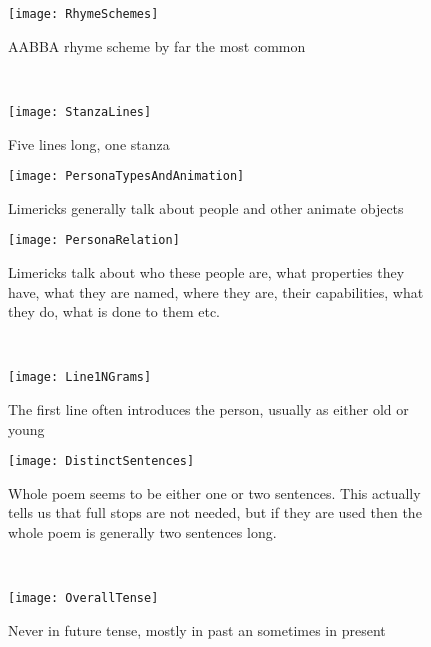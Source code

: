 \begin{figure}[t!]
\centering
\begin{minipage}[t]{.45\textwidth}
	\centering
	\texttt{[image: RhymeSchemes]}
	\caption{AABBA rhyme scheme by far the most common}
	\label{fig:rhyme-scheme-chart}
\end{minipage}
~
\begin{minipage}[t]{.45\textwidth}
	\centering
	\texttt{[image: StanzaLines]}
	\caption{Five lines long, one stanza}
	\label{fig:stanza-lines-chart}
\end{minipage}
\end{figure}

\begin{figure}[h!]
\centering
\texttt{[image: PersonaTypesAndAnimation]}
\caption{Limericks generally talk about people and other animate objects}
\label{fig:persona-chart}
\end{figure}


\begin{figure}[t!]
\centering
\begin{minipage}[t]{.45\textwidth}
	\centering
	\texttt{[image: PersonaRelation]}
	\caption{Limericks talk about who these people are, what properties they have, what they are named, where they are, their capabilities, what they do, what is done to them etc.}
	\label{fig:persona-relation-chart}
\end{minipage}
~
\begin{minipage}[t]{.45\textwidth}
	\centering
	\texttt{[image: Line1NGrams]}
	\caption{The first line often introduces the person, usually as either old or young}
	\label{fig:n-grams-1-chart}
\end{minipage}
\end{figure}


\begin{figure}[t!]
\centering
\begin{minipage}[t]{.45\textwidth}
	\centering
	\texttt{[image: DistinctSentences]}
	\caption{Whole poem seems to be either one or two sentences. This actually tells us that full stops are not needed, but if they are used then the whole poem is generally two sentences long.}
	\label{fig:distinct-sentences-chart}
\end{minipage}
~
\begin{minipage}[t]{.45\textwidth}
	\centering
	\texttt{[image: OverallTense]}
	\caption{Never in future tense, mostly in past an sometimes in present}
	\label{fig:overall-tense-chart}
\end{minipage}
\end{figure}

